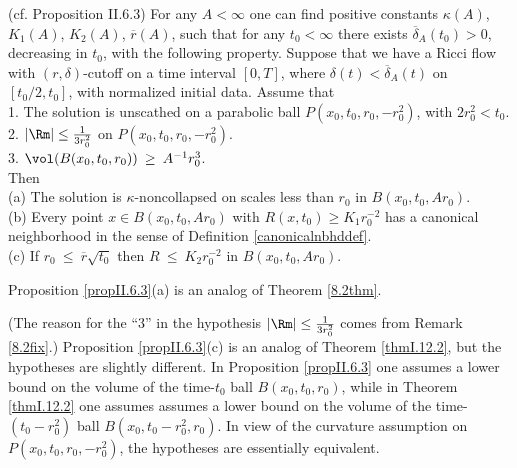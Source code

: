 \begin{proposition}
  \label{prop:kl-proof-double-sided-curvature-bound-thick-part-modulo-two-propositions-existence-canonical-neighborhoods}
 \label{propII.6.3}
(cf. Proposition II.6.3)
For any
$A < \infty$
one can find positive constants
$\kappa(A)$, $K_1(A)$, $K_2(A)$, $\overline{r}(A)$,
such that for any $t_0 < \infty$
there exists $\overline{\delta}_{A}(t_0)
> 0$, decreasing in $t_0$,
with the following property.  Suppose that
we have a Ricci flow with $(r, \delta)$-cutoff on a time interval
$[0, T]$, where $\delta(t) < \overline{\delta}_A(t)$ on $[t_0/2, t_0]$, with
normalized initial data.  Assume that \\
1. The solution is unscathed on a parabolic ball
$P(x_0, t_0, r_0, -r_0^2)$, with $2r_0^2 < t_0$. \\
2. $|\Rm| \le \frac{1}{3r_0^2}$ on $P(x_0, t_0, r_0, -r_0^2)$. \\
3. $\vol(B(x_0, t_0, r_0)) \: \ge \: A^{-1} r_0^3$.\\

Then\\
(a) The solution is $\kappa$-noncollapsed on scales less than $r_0$
in $B(x_0, t_0, Ar_0)$.\\
(b) Every point $x \in B(x_0, t_0, Ar_0)$ with $R(x, t_0) \ge K_1 r_0^{-2}$
has a canonical neighborhood in the sense of
Definition \ref{canonicalnbhddef}.\\
(c) If $r_0 \: \le \: \overline{r} \sqrt{t_0}$ then $R \: \le \: K_2
r_0^{-2}$ in $B(x_0, t_0, Ar_0)$.
\end{proposition}

Proposition \ref{propII.6.3}(a) is an analog of Theorem
\ref{8.2thm}.

(The reason for the ``$3$'' in the hypothesis
$|\Rm| \le \frac{1}{3r_0^2}$ comes from Remark \ref{8.2fix}.)
Proposition \ref{propII.6.3}(c) is an analog of Theorem
\ref{thmI.12.2}, but the hypotheses are slightly different.
In Proposition \ref{propII.6.3} one assumes a lower bound on the volume of the
time-$t_0$ ball $B(x_0, t_0, r_0)$, while in Theorem \ref{thmI.12.2}
one assumes assumes a lower bound on the volume of
the time-$(t_0 - r_0^2)$ ball $B(x_0, t_0 - r_0^2, r_0)$. In
view of the curvature assumption on $P(x_0, t_0, r_0, - r_0^2)$,
the hypotheses are
essentially
equivalent.


